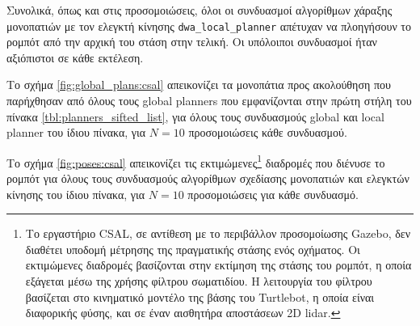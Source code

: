Συνολικά, όπως και στις προσομοιώσεις, όλοι οι συνδυασμοί αλγορίθμων
χάραξης μονοπατιών με τον ελεγκτή κίνησης \texttt{dwa\_local\_planner}
απέτυχαν να πλοηγήσουν το ρομπότ από την αρχική του στάση στην τελική. Οι
υπόλοιποι συνδυασμοί ήταν αξιόπιστοι σε κάθε εκτέλεση.

Το σχήμα \ref{fig:global_plans:csal} απεικονίζει τα μονοπάτια προς
ακολούθηση που παρήχθησαν από όλους τους global planners που εμφανίζονται στην
πρώτη στήλη του πίνακα \ref{tbl:planners_sifted_list}, για όλους τους
συνδυασμούς global και local planner του ίδιου πίνακα, για $N=10$ προσομοιώσεις
κάθε συνδυασμού.

\begin{figure*}
\raggedright
  \begin{subfigure}[t]{\linewidth}
    \centering
    
  \end{subfigure}%
  \vspace{-1.5cm}
  \begin{subfigure}[t]{\linewidth}
    \centering
    
  \end{subfigure}%
  \vspace{-1.5cm}
  \begin{subfigure}[t]{\linewidth}
    \centering
    
  \end{subfigure}%
  \caption{\small Τα σχεδιασθέντα μονοπάτια προς ακολούθηση $\bm{\mathcal{G}}$
           που παρήχθησαν από τους τρεις αλγορίθμους χάραξης μονοπατιών για
           κάθε συνδυασμό τους με ελεγκτή κίνησης του πίνακα
           \ref{tbl:planners_sifted_list}, σε σχέση με τις ορισμένες αρχικές και
           τελικές στάσεις του περιβάλλοντος CSAL}
  \label{fig:global_plans:csal}
\end{figure*}

Το σχήμα \ref{fig:poses:csal} απεικονίζει τις εκτιμώμενες\footnote{Το
εργαστήριο CSAL, σε αντίθεση με το περιβάλλον προσομοίωσης Gazebo, δεν διαθέτει
υποδομή μέτρησης της πραγματικής στάσης ενός οχήματος. Oι εκτιμώμενες διαδρομές
βασίζονται στην εκτίμηση της στάσης του ρομπότ, η οποία εξάγεται μέσω της
χρήσης φίλτρου σωματιδίου. Η λειτουργία του φίλτρου βασίζεται στο κινηματικό
μοντέλο της βάσης του Turtlebot, η οποία είναι διαφορικής φύσης, και σε έναν
αισθητήρα αποστάσεων 2D lidar.} διαδρομές που διένυσε το ρομπότ για όλους τους
συνδυασμούς αλγορίθμων σχεδίασης μονοπατιών και ελεγκτών κίνησης του ίδιου
πίνακα, για $N=10$ προσομοιώσεις για κάθε συνδυασμό.

